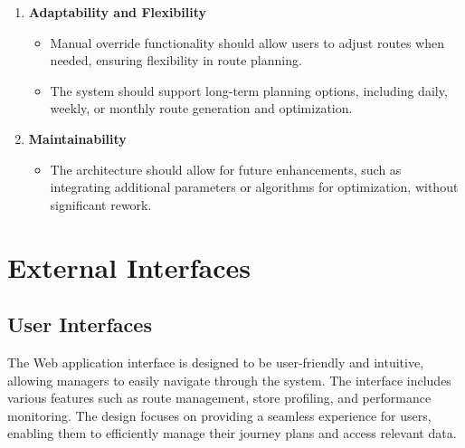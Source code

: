 \begin{enumerate}
\begin{itemize}
    \end{itemize}
    
    \item \textbf{Adaptability and Flexibility}
    \begin{itemize}
        \item Manual override functionality should allow users to adjust routes when needed, ensuring flexibility in route planning.
        \item The system should support long-term planning options, including daily, weekly, or monthly route generation and optimization.
    \end{itemize}
    
    \item \textbf{Maintainability}
    \begin{itemize}
        \item The architecture should allow for future enhancements, such as integrating additional parameters or algorithms for optimization, without significant rework.
    \end{itemize}
    
\end{enumerate}

\section{External Interfaces}


\subsection{User Interfaces}
The Web application interface is designed to be user-friendly and intuitive, allowing managers to easily navigate through the system. The interface includes various features such as route management, store profiling, and performance monitoring. The design focuses on providing a seamless experience for users, enabling them to efficiently manage their journey plans and access relevant data.

